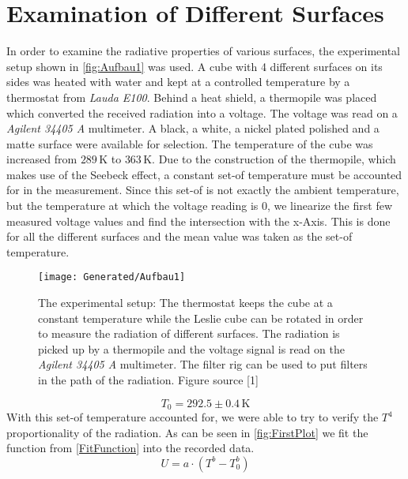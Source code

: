 \documentclass[a4paper,10pt,twocolumn]{article}
\begin{document}
    \section{Examination of Different Surfaces}\label{sec:ExaminationOfDifferentSurfaces}
    In order to examine the radiative properties of various surfaces, the experimental setup shown in \autoref{fig:Aufbau1} was used.
    A cube with 4 different surfaces on its sides was heated with water and kept at a controlled temperature by a thermostat from \textit{Lauda E100}.
    Behind a heat shield, a thermopile was placed which converted the received radiation into a voltage.
    The voltage was read on a \textit{Agilent 34405 A} multimeter.
    A black, a white, a nickel plated polished and a matte surface were available for selection.
    The temperature of the cube was increased from $ 289\,$K to $363\,$K.
    Due to the construction of the thermopile, which makes use of the Seebeck effect, a constant set-of temperature must be accounted for in the measurement.
    Since this set-of is not exactly the ambient temperature, but the temperature at which the voltage reading is $0$, we linearize the first few measured voltage values 
    and find the intersection with the x-Axis.
    This is done for all the different surfaces and the mean value was taken as the set-of temperature.
    \begin{figure}
        \begin{center}
            \texttt{[image: Generated/Aufbau1]}
            \caption{The experimental setup: The thermostat keeps the cube at a constant temperature while the Leslie 
            cube can be rotated in order to measure the radiation of different surfaces.
            The radiation is picked up by a thermopile and the voltage signal is read on the \textit{Agilent 34405 A} multimeter.
            The filter rig can be used to put filters in the path of the radiation.
            Figure source [1]}
            \label{fig:Aufbau1}
        \end{center}
    \end{figure}
    \begin{equation}\label{SetofTemp}
        T_0 = 292.5 \pm 0.4 \,\text{K}
    \end{equation}
    With this set-of temperature accounted for, we were able to try to verify the $T^4$ proportionality of the radiation.
    As can be seen in \autoref{fig:FirstPlot} we fit the function from \autoref{FitFunction} into the recorded data.
    \begin{equation}\label{FitFunction}
        U = a\cdot (T^b - T_0^b)
    \end{equation}
    
\end{document}
